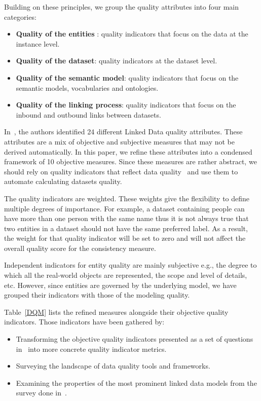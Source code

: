 \documentclass[a4paper,11pt,twoside]{ThesisStyle}
\begin{document}
\noindent
Building on these principles, we group the quality attributes into four main categories:

\begin{itemize}
	\item \textbf{Quality of the entities }: quality indicators that focus on the data at the instance level.
	\item \textbf{Quality of the dataset}: quality indicators at the dataset level.
	\item \textbf{Quality of the semantic model}: quality indicators that focus on the semantic models, vocabularies and ontologies.
	\item \textbf{Quality of the linking process}: quality indicators that focus on the inbound and outbound links between datasets.
\end{itemize}

In~\cite{Assaf:DQMST:12}, the authors identified 24 different Linked Data quality attributes. These attributes are a mix of objective and subjective measures that may not be derived automatically. In this paper, we refine these attributes into a condensed framework of 10 objective measures. Since these measures are rather abstract, we should rely on quality indicators that reflect data quality~\cite{Flemming:Thesis:10} and use them to automate calculating datasets quality.

The quality indicators are weighted. These weights give the flexibility to define multiple degrees of importance. For example, a dataset containing people can have more than one person with the same name thus it is not always true that two entities in a dataset should not have the same preferred label. As a result, the weight for that quality indicator will be set to zero and will not affect the overall quality score for the consistency measure.

Independent indicators for entity quality are mainly subjective e.g., the degree to which all the real-world objects are represented, the scope and level of details, etc. However, since entities are governed by the underlying model, we have grouped their indicators with those of the modeling quality.

Table~\ref{DQM} lists the refined measures alongside their objective quality indicators. Those indicators have been gathered by:

\begin{itemize}
	\item Transforming the objective quality indicators presented as a set of questions in~\cite{Assaf:DQMST:12} into more concrete quality indicator metrics.
	\item Surveying the landscape of data quality tools and frameworks.
	\item Examining the properties of the most prominent linked data models from the survey done in~\cite{Assaf:PROFILES:15}.
\end{itemize}
\end{document}

